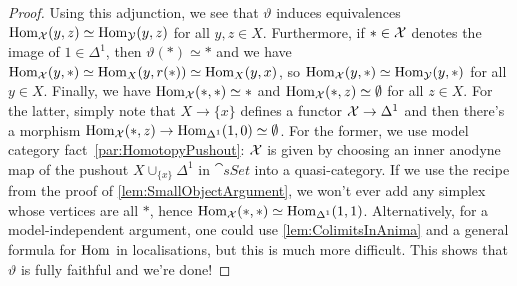\begin{proof}
	Using this adjunction, we see that $\vartheta$ induces equivalences $\operatorname{Hom}_{\mathcal{X}}(y,z)\simeq \operatorname{Hom}_{\mathcal{Y}}(y,z)$ for all $y,z\in X$. Furthermore, if $*\in \mathcal{X}$ denotes the image of $1\in \Delta^1$, then $\vartheta(*)\simeq *$ and we have $\operatorname{Hom}_{\mathcal{X}}(y,*)\simeq \operatorname{Hom}_X(y,r(*))\simeq \operatorname{Hom}_X(y,x)$, so $\operatorname{Hom}_{\mathcal{X}}(y,*)\simeq \operatorname{Hom}_{\mathcal{Y}}(y,*)$ for all $y\in X$. Finally, we have $\operatorname{Hom}_{\mathcal{X}}(*,*)\simeq *$ and $\operatorname{Hom}_{\mathcal{X}}(*,z)\simeq \emptyset$ for all $z\in X$. For the latter, simply note that $X\rightarrow\{x\}$ defines a functor $\mathcal{X}\rightarrow \Delta^1$ and then there's a morphism $\operatorname{Hom}_{\mathcal{X}}(*,z)\rightarrow \operatorname{Hom}_{\Delta^1}(1,0)\simeq \emptyset$. For the former, we use model category fact~\cref{par:HomotopyPushout}: $\mathcal{X}$ is given by choosing an inner anodyne map of the pushout $X\cup_{\{x\}}\Delta^1$ in $\cat{sSet}$ into a quasi-category. If we use the recipe from the proof of \cref{lem:SmallObjectArgument}, we won't ever add any simplex whose vertices are all $*$, hence $\operatorname{Hom}_{\mathcal{X}}(*,*)\simeq \operatorname{Hom}_{\Delta^1}(1,1)$. Alternatively, for a model-independent argument, one could use \cref{lem:ColimitsInAnima} and a general formula for $\operatorname{Hom}$ in localisations, but this is much more difficult. This shows that $\vartheta$ is fully faithful and we're done!
\end{proof}
